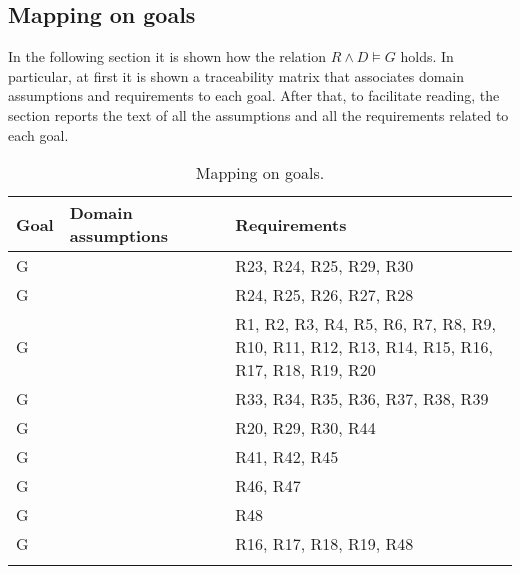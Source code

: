 \subsection{Mapping on goals}
\label{subsec: map_on_g}%
In the following section it is shown how the relation $R\land D \models G$ holds.
In particular, at first it is shown a traceability matrix that associates domain assumptions and requirements to each goal.
After that, to facilitate reading, the section reports the text of all the assumptions and all the requirements related to each goal.
\setcounter{mg}{1}
\newcommand{\cmg}{\themg\stepcounter{mg}}
\begin{center}
    \begin{longtable}{|p{0.06\linewidth}|p{0.34\linewidth}|p{0.6\linewidth}|}
        \hline
        \textbf{Goal} & \textbf{Domain assumptions}                       & \textbf{Requirements}                                                               \\
        \hline
        G\cmg         &                             & R23, R24, R25, R29, R30                        \\
        \hline
        G\cmg         &                             & R24, R25, R26, R27, R28                                      \\
        \hline
        G\cmg         &                             & R1, R2, R3, R4, R5, R6, R7, R8, R9, R10, R11, R12, R13, R14, R15, R16, R17, R18, R19, R20                                \\
        \hline
        G\cmg         &                             & R33, R34, R35, R36, R37, R38, R39              \\
        \hline
        G\cmg         &                             & R20, R29, R30, R44                               \\
        \hline
        G\cmg         &                             & R41, R42, R45                     \\
        \hline
        G\cmg         &                             & R46, R47                                \\
        \hline
        G\cmg         &                             & R48                                                   \\
        \hline
        G\cmg         &                             & R16, R17, R18, R19, R48                                               \\
        \hline
        \caption{Mapping on goals.}
        \label{tab: map_on_g}%
    \end{longtable}
\end{center}

